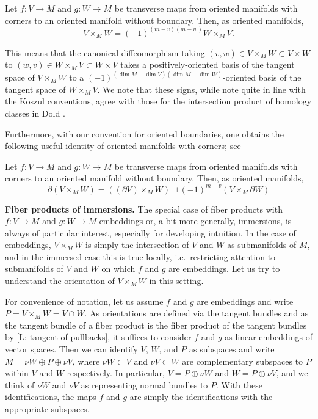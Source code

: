 \begin{proposition}\label{P: commute oriented fiber}
Let $f:V\to M$ and $g:W\to M$ be transverse maps from oriented manifolds with corners to an oriented manifold without boundary. Then, as oriented manifolds,
\begin{equation*}
V\times_M W=(-1)^{(m-v)(m-w)}W\times_M V.
\end{equation*}
\end{proposition}
This means that the canonical diffeomorphism taking $(v,w)\in V\times_MW\subset V\times W$ to $(w,v)\in W\times_MV\subset W\times V$ takes a positively-oriented basis of the tangent space of $V\times_MW$ to a $(-1)^{(\dim M-\dim V)(\dim M-\dim W)}$-oriented basis of the tangent space of $W\times_MV$.
We note that these signs, while note quite in line with the Koszul conventions, agree with those for the intersection product of homology classes in Dold \cite[Section VIII.13]{Dol72}.




 Furthermore, with our convention for oriented boundaries,  one obtains the following useful identity  of oriented manifolds with corners; see \cite[Propositions 7.4 and 7.5]{Joy12}

\begin{proposition}\label{P: oriented fiber boundary}
Let $f:V\to M$ and $g:W\to M$ be transverse maps from oriented manifolds with corners to an oriented manifold without boundary. Then, as oriented manifolds,
\begin{equation*}
\partial (V \times_M W) = ((\partial V )\times_M W )\sqcup (-1)^{m-v}(V \times_M \partial W)
\end{equation*}
\end{proposition}




\medskip

\noindent\textbf{Fiber products of immersions.}
The special case of fiber products with $f:V\to M$ and $g:W\to M$ embeddings or, a bit more generally, immersions, is always of particular interest, especially for developing intuition. In the case of embeddings, $V\times_MW$ is simply the intersection of $V$ and $W$ as submanifolds of $M$, and in the immersed case this is true locally, i.e.\ restricting attention to submanifolds of $V$ and $W$ on which $f$ and $g$ are embeddings. Let us try to understand the orientation of $V\times_MW$ in this setting.

For convenience of notation, let us assume $f$ and $g$ are embeddings and write $P=V\times_MW=V\cap W$. As orientations are defined via the tangent bundles and as the tangent bundle of a fiber product is the fiber product of the tangent bundles by \cref{L: tangent of pullbacks}, it suffices to consider $f$ and $g$ as linear embeddings of vector spaces. Then we can identify $V$, $W$, and $P$ as subspaces and write $M=\nu W\oplus P \oplus \nu V$, where $\nu W\subset V$ and $\nu V\subset W$ are complementary subspaces to $P$ within $V$ and $W$ respectively. In particular, $V=P\oplus \nu W$ and $W=P\oplus \nu V$, and we think of $\nu W$ and $\nu V$ as representing normal bundles to $P$. With these identifications, the maps $f$ and $g$ are simply the identifications with the appropriate subspaces.


